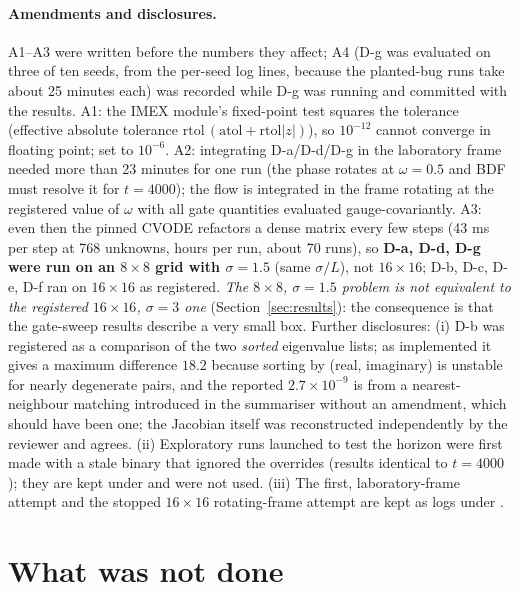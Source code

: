 \documentclass[11pt,a4paper]{article}
\begin{document}
\paragraph{Amendments and disclosures.} A1--A3 were written before the numbers they affect; A4 (D-g was evaluated on three
of ten seeds, from the per-seed log lines, because the planted-bug runs take about 25 minutes each) was recorded while D-g was
running and committed with the results. A1: the IMEX module's fixed-point test squares the tolerance
(effective absolute tolerance $\mathrm{rtol}\,(\mathrm{atol}+\mathrm{rtol}|z|)$), so $10^{-12}$ cannot converge in floating point;
set to $10^{-6}$. A2: integrating D-a/D-d/D-g in the laboratory frame needed more than 23 minutes for one run (the phase rotates
at $\omega=0.5$ and BDF must resolve it for $t=4000$); the flow is integrated in the frame rotating at the registered value of
$\omega$ with all gate quantities evaluated gauge-covariantly. A3: even then the pinned CVODE refactors a dense matrix
every few steps (43 ms per step at 768 unknowns, hours per run, about 70 runs), so \textbf{D-a, D-d, D-g were run on an
$8\times8$ grid with $\sigma=1.5$} (same $\sigma/L$), not $16\times16$; D-b, D-c, D-e, D-f ran on $16\times16$ as registered.
\emph{The $8\times8$, $\sigma=1.5$ problem is not equivalent to the registered $16\times16$, $\sigma=3$ one} (Section~\ref{sec:results}):
the consequence is that the gate-sweep results describe a very small box. Further disclosures: (i) D-b was registered as a comparison of the two
\emph{sorted} eigenvalue lists; as implemented it gives a maximum difference $18.2$ because sorting by (real, imaginary) is unstable
for nearly degenerate pairs, and the reported $2.7\times10^{-9}$ is from a nearest-neighbour matching introduced in the summariser
without an amendment, which should have been one; the Jacobian itself was reconstructed independently by the reviewer and agrees.
(ii) Exploratory runs launched to test the horizon were first made with a stale binary that ignored the overrides (results identical to
$t=4000$); they are kept under  and were not used. (iii) The first, laboratory-frame attempt
and the stopped $16\times16$ rotating-frame attempt are kept as logs under .



\section{What was not done}\label{sec:notdone}
\end{document}
